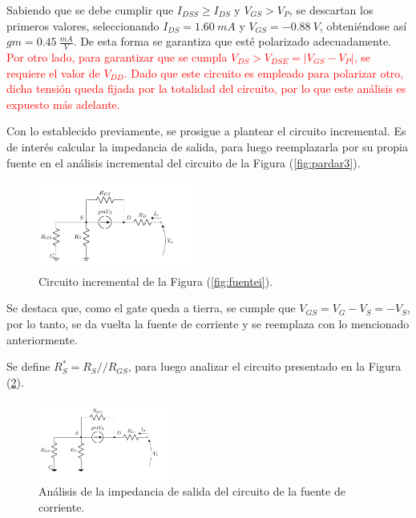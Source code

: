 Sabiendo que se debe cumplir que $I_{DSS} \geq I_{DS}$ y $V_{GS} > V_{P}$, se descartan los primeros valores, seleccionando $I_{DS} = 1.60 \ mA$ y $V_{GS} = -0.88 \ V$, obteniéndose así $gm = 0.45 \ \frac{mA}{V}$. De esta forma se garantiza que esté polarizado adecuadamente. \textcolor{red}{Por otro lado, para garantizar que se cumpla $V_{DS} > V_{DSE} = |V_{GS} - V_P|$, se requiere el valor de $V_{DD}$. Dado que este circuito es empleado para polarizar otro, dicha tensión queda fijada por la totalidad del circuito, por lo que este análisis es expuesto más adelante.}

Con lo establecido previamente, se prosigue a plantear el circuito incremental. Es de interés calcular la impedancia de salida, para luego reemplazarla por su propia fuente en el análisis incremental del circuito de la Figura (\ref{fig:pardar3}).
\begin{figure}[H]
\centering
	\includegraphics[width=0.45\textwidth, page=1]{Imagenes/ModeloIncremental.pdf}
	\caption{Circuito incremental de la Figura (\ref{fig:fuentei}).}
\label{fig:incfuente1}
\end{figure}

Se destaca que, como el gate queda a tierra, se cumple que $V_{GS} = V_G - V_S = - V_S$, por lo tanto, se da vuelta la fuente de corriente y se reemplaza con lo mencionado anteriormente. 

Se define $R_S^* = R_S // R_{GS}$, para luego analizar el circuito presentado en la Figura (\ref{fig:incfuente2}).
\begin{figure}[H]
\centering
\hspace*{2cm}
	\includegraphics[width=0.4\textwidth, page=2]{Imagenes/ModeloIncremental.pdf}
	\caption{Análisis de la impedancia de salida del circuito de la fuente de corriente.}
\label{fig:incfuente2}
\end{figure}

